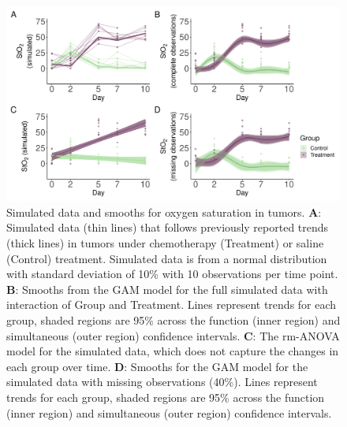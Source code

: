 \documentclass[
]{article}
\begin{document}
\begin{figure}

{\centering \includegraphics[width=1\linewidth]{Full_document_SIM_No_Appendix_files/figure-latex/sim-smooth-plot-1} 

}

\caption{Simulated data and smooths for oxygen saturation in tumors. \textbf{A}: Simulated data (thin lines) that follows previously reported trends (thick lines) in tumors under chemotherapy (Treatment) or saline (Control) treatment. Simulated data is from a normal distribution with standard deviation of 10\% with 10 observations per time point. \textbf{B}: Smooths from the GAM model for the full simulated data with interaction of Group and Treatment. Lines represent trends for each group, shaded regions are 95\% across the function (inner region) and simultaneous (outer region) confidence intervals. \textbf{C}: The rm-ANOVA model for the simulated data, which does not capture the changes in each group over time. \textbf{D}: Smooths for the GAM model for the simulated data with missing observations (40\%). Lines represent trends for each group, shaded regions are 95\% across the function (inner region) and simultaneous (outer region) confidence intervals.}\label{fig:sim-smooth-plot}
\end{figure}
\end{document}
